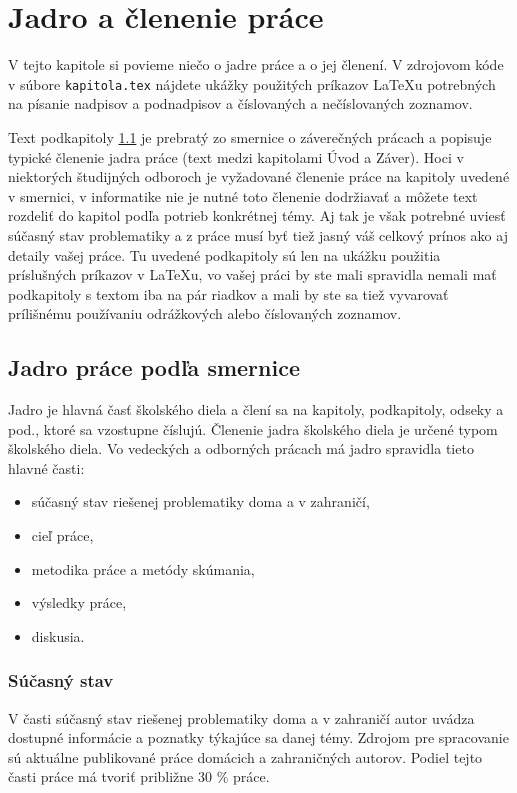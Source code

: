 \chapter{Jadro a členenie práce}

\label{kap:clenenie} %

V tejto kapitole si povieme niečo o jadre práce a o jej členení. V
zdrojovom kóde v súbore \verb'kapitola.tex' nájdete ukážky použitých
príkazov LaTeXu potrebných na písanie nadpisov a podnadpisov a
číslovaných a nečíslovaných zoznamov.

Text podkapitoly \ref{sec:jadro} je
prebratý zo smernice o záverečných prácach a popisuje typické členenie jadra práce (text medzi kapitolami Úvod a Záver). Hoci v niektorých študijných odboroch je vyžadované členenie práce na kapitoly uvedené v smernici, v informatike nie je nutné toto členenie dodržiavať a môžete text rozdeliť do kapitol podľa potrieb konkrétnej témy. Aj tak je však potrebné uviesť súčasný stav problematiky a z práce musí byť tiež jasný váš celkový prínos ako aj detaily vašej práce. Tu uvedené podkapitoly sú len na ukážku použitia príslušných príkazov v LaTeXu, vo vašej práci by ste mali spravidla nemali mať podkapitoly s textom iba na pár riadkov a mali by ste sa tiež vyvarovať prílišnému používaniu odrážkových alebo číslovaných zoznamov.

\section{Jadro práce podľa smernice}
\label{sec:jadro}
Jadro je hlavná časť školského diela a člení sa na kapitoly,
podkapitoly, odseky a pod., ktoré sa vzostupne číslujú.
Členenie jadra školského diela je určené typom  školského diela. Vo vedeckých 
a odborných prácach má jadro spravidla tieto hlavné časti:
\begin{itemize}
\item  súčasný stav riešenej problematiky doma a v zahraničí,
\item  cieľ práce,
\item  metodika práce a metódy skúmania,
\item  výsledky práce, 
\item  diskusia. 
\end{itemize}

\subsection{Súčasný stav}
V časti súčasný stav riešenej problematiky doma a v zahraničí autor uvádza 
dostupné informácie a poznatky týkajúce sa danej témy. Zdrojom pre spracovanie sú 
aktuálne publikované práce domácich a zahraničných autorov.  Podiel tejto časti práce 
má tvoriť približne 30 \% práce.


